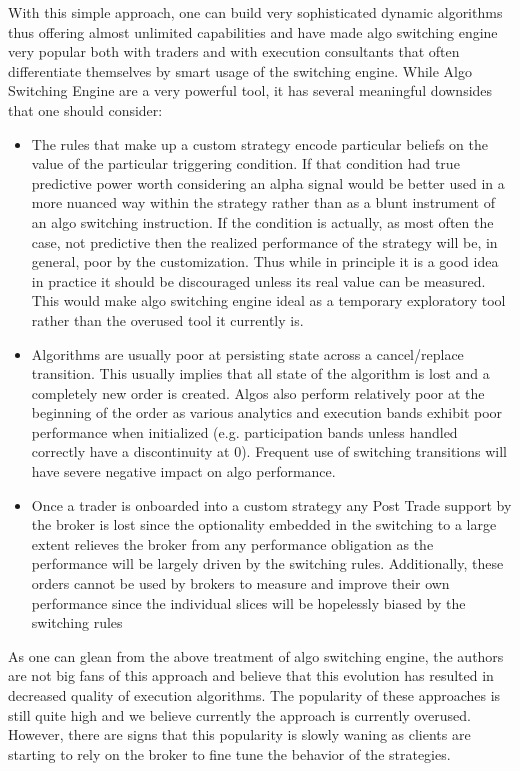 With this simple approach, one can build very sophisticated dynamic algorithms thus offering almost unlimited capabilities and have made algo switching engine very popular both with traders and with execution consultants that often differentiate themselves by smart usage of the switching engine. While Algo Switching Engine are a very powerful tool, it has several meaningful downsides that one should consider:

\begin{itemize}
\item The rules that make up a custom strategy encode particular beliefs on the value of the particular triggering condition. If that condition had true predictive power worth considering an alpha signal would be better used in a more nuanced way within the strategy rather than as a blunt instrument of an algo switching instruction. If the condition is actually, as most often the case, not predictive then the realized performance of the strategy will be, in general, poor by the customization. Thus while in principle it is a good idea in practice it should be discouraged unless its real value can be measured. This would make algo switching engine ideal as a temporary exploratory tool rather than the overused tool it currently is.

\item  Algorithms are usually poor at persisting state across a cancel/replace transition. This usually implies that all state of the algorithm is lost and a completely new order is created. Algos also perform relatively poor at the beginning of the order as various analytics and execution bands exhibit poor performance when initialized (e.g. participation bands unless handled correctly have a discontinuity at 0). Frequent use of switching transitions will have severe negative impact on algo performance.

\item Once a trader is onboarded into a custom strategy any Post Trade support by the broker is lost since the optionality embedded in the switching to a large extent relieves the broker from any performance obligation as the performance will be largely driven by the switching rules. Additionally, these orders cannot be used by brokers to measure and improve their own performance since the individual slices will be hopelessly biased by the switching rules
\end{itemize}


As one can glean from the above treatment of algo switching engine, the authors are not big fans of this approach and believe that this evolution has resulted in decreased quality of execution algorithms. The popularity of these approaches is still quite high and we believe currently the approach is currently overused. However, there are signs that this popularity is slowly waning as clients are starting to rely on the broker to fine tune the behavior of the strategies. \\


